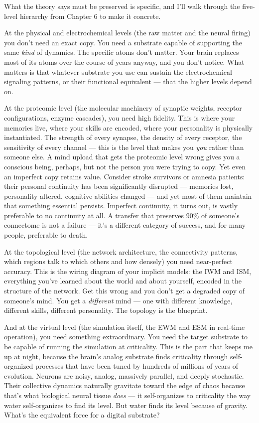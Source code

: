 \documentclass[11pt, twoside, openright]{book}
\begin{document}
What the theory says must be preserved is specific, and I'll walk through the five-level hierarchy from Chapter 6 to make it concrete.

At the physical and electrochemical levels (the raw matter and the neural firing) you don't need an exact copy. You need a substrate capable of supporting the same \textit{kind} of dynamics. The specific atoms don't matter. Your brain replaces most of its atoms over the course of years anyway, and you don't notice. What matters is that whatever substrate you use can sustain the electrochemical signaling patterns, or their functional equivalent --- that the higher levels depend on.

At the proteomic level (the molecular machinery of synaptic weights, receptor configurations, enzyme cascades), you need high fidelity. This is where your memories live, where your skills are encoded, where your personality is physically instantiated. The strength of every synapse, the density of every receptor, the sensitivity of every channel --- this is the level that makes you \textit{you} rather than someone else. A mind upload that gets the proteomic level wrong gives you a conscious being, perhaps, but not the person you were trying to copy. Yet even an imperfect copy retains value. Consider stroke survivors or amnesia patients: their personal continuity has been significantly disrupted --- memories lost, personality altered, cognitive abilities changed --- and yet most of them maintain that something essential persists. Imperfect continuity, it turns out, is vastly preferable to no continuity at all. A transfer that preserves 90\% of someone's connectome is not a failure --- it's a different category of success, and for many people, preferable to death.

At the topological level (the network architecture, the connectivity patterns, which regions talk to which others and how densely) you need near-perfect accuracy. This is the wiring diagram of your implicit models: the IWM and ISM, everything you've learned about the world and about yourself, encoded in the structure of the network. Get this wrong and you don't get a degraded copy of someone's mind. You get a \textit{different} mind --- one with different knowledge, different skills, different personality. The topology is the blueprint.

And at the virtual level (the simulation itself, the EWM and ESM in real-time operation), you need something extraordinary. You need the target substrate to be capable of running the simulation at criticality. This is the part that keeps me up at night, because the brain's analog substrate finds criticality through self-organized processes that have been tuned by hundreds of millions of years of evolution. Neurons are noisy, analog, massively parallel, and deeply stochastic. Their collective dynamics naturally gravitate toward the edge of chaos because that's what biological neural tissue \textit{does} --- it self-organizes to criticality the way water self-organizes to find its level. But water finds its level because of gravity. What's the equivalent force for a digital substrate?
\end{document}
